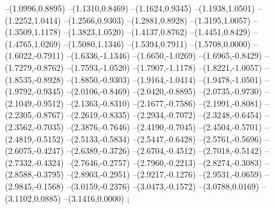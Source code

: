 {--(1.0996,0.8895)
--(1.1310,0.8469)
--(1.1624,0.9345)
--(1.1938,1.0501)
--(1.2252,1.0414)
--(1.2566,0.9303)
--(1.2881,0.8928)
--(1.3195,1.0057)
--(1.3509,1.1178)
--(1.3823,1.0520)
--(1.4137,0.8762)
--(1.4451,0.8429)
--(1.4765,1.0269)
--(1.5080,1.1346)
--(1.5394,0.7911)
--(1.5708,0.0000)
--(1.6022,-0.7911)
--(1.6336,-1.1346)
--(1.6650,-1.0269)
--(1.6965,-0.8429)
--(1.7279,-0.8762)
--(1.7593,-1.0520)
--(1.7907,-1.1178)
--(1.8221,-1.0057)
--(1.8535,-0.8928)
--(1.8850,-0.9303)
--(1.9164,-1.0414)
--(1.9478,-1.0501)
--(1.9792,-0.9345)
--(2.0106,-0.8469)
--(2.0420,-0.8895)
--(2.0735,-0.9730)
--(2.1049,-0.9512)
--(2.1363,-0.8310)
--(2.1677,-0.7586)
--(2.1991,-0.8081)
--(2.2305,-0.8767)
--(2.2619,-0.8335)
--(2.2934,-0.7072)
--(2.3248,-0.6454)
--(2.3562,-0.7035)
--(2.3876,-0.7646)
--(2.4190,-0.7045)
--(2.4504,-0.5701)
--(2.4819,-0.5152)
--(2.5133,-0.5834)
--(2.5447,-0.6428)
--(2.5761,-0.5696)
--(2.6075,-0.4247)
--(2.6389,-0.3726)
--(2.6704,-0.4512)
--(2.7018,-0.5142)
--(2.7332,-0.4324)
--(2.7646,-0.2757)
--(2.7960,-0.2213)
--(2.8274,-0.3083)
--(2.8588,-0.3795)
--(2.8903,-0.2951)
--(2.9217,-0.1276)
--(2.9531,-0.0659)
--(2.9845,-0.1568)
--(3.0159,-0.2376)
--(3.0473,-0.1572)
--(3.0788,0.0169)
--(3.1102,0.0885)
--(3.1416,0.0000)
;}
